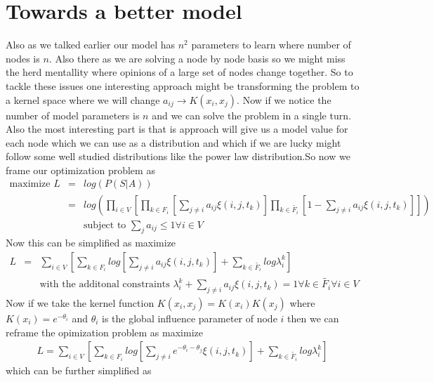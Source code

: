 \section*{Towards a better model}
Also as we talked earlier our model has $n^2$ parameters to learn where number of nodes is $n$. Also there as we are solving a node by node basis so we might miss the herd mentallity where opinions of a large set of nodes change together. So to tackle these issues one interesting approach might be transforming the problem to a kernel space where we will change $a_{ij} \rightarrow K(x_i,x_j)$. Now if we notice the number of model parameters is $n$ and we can solve the problem in a single turn. Also the most interesting part is that is approach will give us a model value for each node which we can use as a distribution and which if we are lucky might follow some well studied distributions like the power law distribution.So now we frame our optimization problem as
\begin{eqnarray*}
\mbox{maximize } L 	&=& log(P(S|A)) \\
				  	&=& log(\displaystyle\prod_{i \in V}[\displaystyle\prod_{k \in F_i}[\displaystyle\sum_{j 								\neq i} a_{ij}\xi (i,j,t_k)]\displaystyle\prod_{k \in \widetilde{F_{i}}} 											[1-\displaystyle\sum_{j \neq i}a_{ij}\xi (i,j,t_k)]]) \\
				  	&& {} \mbox{subject to } \displaystyle\sum_{j} a_{ij} \leq 1 \forall i \in V
\end{eqnarray*}
Now this can be simplified as maximize 
\begin{eqnarray*}
L &=& 	\displaystyle\sum_{i \in V}[\displaystyle\sum_{k \in F_i}log[\displaystyle\sum_{j \neq i} a_{ij}\xi 				(i,j,t_k)]+\displaystyle\sum_{k \in \widetilde{F_{i}}}log\lambda_{i}^{k}] \\
  && {} \mbox{with the additonal constraints } \lambda_{i}^{k} + \displaystyle\sum_{j \neq i}a_{ij}\xi (i,j,t_k) = 1 \forall k \in \widetilde{F_{i}} \forall i \in V
\end{eqnarray*}
Now if we take the kernel function $K(x_i,x_j) = K(x_i)K(x_j)$ where $K(x_i) = e^{-\theta_i}$ and $\theta_i$ is the global influence parameter of node $i$ then we can reframe the opimization problem as maximize 
\begin{eqnarray*}
L = \displaystyle\sum_{i \in V}[\displaystyle\sum_{k \in F_i}log[\displaystyle\sum_{j \neq i} e^{-\theta_i-\theta_j}\xi (i,j,t_k)]+\displaystyle\sum_{k \in \widetilde{F_{i}}}log\lambda_{i}^{k}]
\end{eqnarray*}
which can be further simplified as 
